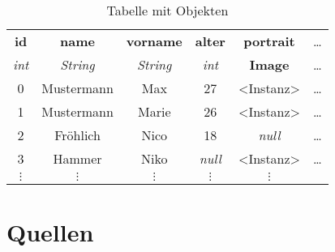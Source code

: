 \documentclass[twocolumn]{article}
\begin{document}
    \begin{table}[!htb]
        \centering
        \begin{adjustbox}{width=0.45\textwidth}
            \small
            \begin{tabular}[c]{|c|c|c|c|c|c}

                \hline

                \multicolumn{1}{|c|}{\textbf{id}} &
                \multicolumn{1}{c|}{\textbf{name}} &
                \multicolumn{1}{c|}{\textbf{vorname}} &
                \multicolumn{1}{c|}{\textbf{alter}} &
                \multicolumn{1}{c|}{\textbf{portrait}} &
                \multicolumn{1}{c}{\dots} \\

                \multicolumn{1}{|c|}{\textit{int}} &
                \multicolumn{1}{c|}{\textit{String}} &
                \multicolumn{1}{c|}{\textit{String}} &
                \multicolumn{1}{c|}{\textit{int}} &
                \multicolumn{1}{c|}{\textbf{Image}} &
                \multicolumn{1}{c}{\dots} \\

                \hline

                0  & Mustermann  & Max    & 27             & <Instanz>      & \dots \\
                1  & Mustermann  & Marie  & 26             & <Instanz>      & \dots \\
                2  & Fröhlich    & Nico   & 18             & \textit{null}  & \dots \\
                3  & Hammer      & Niko   & \textit{null}  & <Instanz>     & \dots \\
                $\vdots$ & $\vdots$ & $\vdots$ & $\vdots$ & $\vdots$ &

            \end{tabular}
        \end{adjustbox}
        \caption{Tabelle mit Objekten}
        \label{tab:erwachseneMitBildern}
    \end{table}

    \section{Quellen}
    \nocite{*}
    \printbibliography
\end{document}
